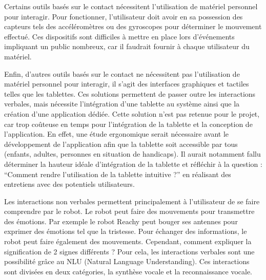 Certains outils basés sur le contact nécessitent l'utilisation de matériel personnel pour interagir. Pour fonctionner, l’utilisateur doit avoir en sa possession des capteurs tels des accéléromètres ou des gyroscopes pour déterminer le mouvement effectué. Ces dispositifs sont difficiles à mettre en place lors d'événements impliquant un public nombreux, car il faudrait fournir à chaque utilisateur du matériel.

Enfin, d'autres outils basés sur le contact ne nécessitent pas l'utilisation de matériel personnel pour interagir, il s’agit des interfaces graphiques et tactiles telles que les tablettes. Ces solutions permettent de passer outre les interactions verbales, mais nécessite l’intégration d’une tablette au système ainsi que la création d’une application dédiée. Cette solution n’est pas retenue pour le projet, car trop coûteuse en temps pour l’intégration de la tablette et la conception de l’application. En effet, une étude ergonomique serait nécessaire avant le développement de l’application afin que la tablette soit accessible par tous (enfants, adultes, personnes en situation de handicaps).  Il aurait notamment fallu déterminer la hauteur idéale d'intégration de la tablette et réfléchir à la question : “Comment rendre l’utilisation de la tablette intuitive ?” en réalisant des entretiens avec des potentiels utilisateurs.

Les interactions non verbales permettent principalement à l’utilisateur de se faire comprendre par le robot. Le robot peut  faire des mouvements pour transmettre des émotions. Par exemple le robot Reachy peut bouger ses antennes pour exprimer des émotions tel que la tristesse. Pour échanger des informations, le robot peut faire également des mouvements. Cependant, comment expliquer la signification de 2 signes différents ? Pour cela, les interactions verbales sont une possibilité grâce au NLU (Natural Language Understanding). Ces interactions sont divisées en deux catégories, la synthèse vocale  et la reconnaissance vocale. 

